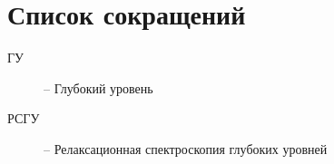 \chapter*{Список сокращений}


\begin{description}
    \item[ГУ] -- Глубокий уровень
    \item[РСГУ] -- Релаксационная спектроскопия глубоких уровней
\end{description}